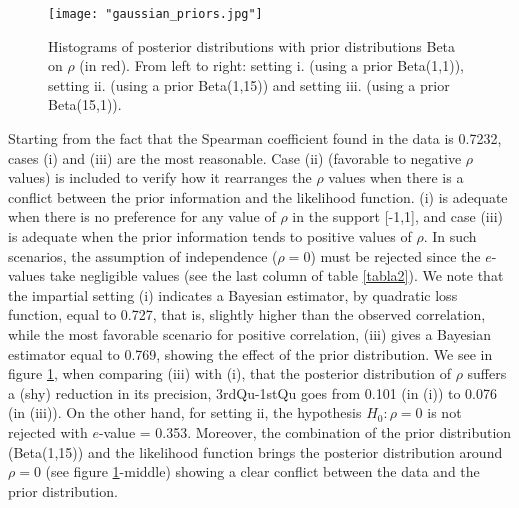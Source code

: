 \documentclass{aip-cp}
\begin{document}
\begin{figure}[h!]
\caption{Histograms of posterior distributions with prior distributions Beta on $\rho$ (in red). From left to right: setting i. (using a prior Beta(1,1)), setting ii. (using a prior Beta(1,15)) and setting iii. (using a prior Beta(15,1)). } \label{graf3}
\centering
\texttt{[image: "gaussian\_priors.jpg"]}
\end{figure}
Starting from the fact that the Spearman coefficient found in the data is 0.7232, cases (i) and (iii) are the most reasonable. Case (ii) (favorable to negative $\rho$ values) is included to verify how it rearranges the $\rho$ values when there is a conflict between the prior information and the likelihood function. (i) is adequate when there is no preference for any value of $\rho$ in the support [-1,1], and case (iii) is adequate when the prior information tends to positive values of $\rho .$ In such scenarios, the assumption of independence ($\rho=0$) must be rejected since the $e$-values take negligible values (see the last column of table \ref{tabla2}). We note that the impartial setting (i)  indicates a Bayesian estimator, by quadratic loss function, equal to 0.727, that is, slightly higher than the observed correlation, while the most favorable scenario for positive correlation, (iii) gives a Bayesian estimator equal to 0.769, showing the effect of the prior distribution. We see in figure \ref{graf3}, when comparing (iii) with (i), that the posterior distribution of $\rho$ suffers a (shy) reduction in its precision, 3rdQu-1stQu goes from 0.101 (in (i)) to  0.076 (in (iii)). On the other hand,  for setting ii, the hypothesis $H_0: \rho = 0$ is not rejected with $e$-value = 0.353. Moreover, the combination of the prior distribution (Beta(1,15)) and the likelihood function brings the posterior distribution around $\rho=0$ (see figure \ref{graf3}-middle) showing a clear conflict between the data and the prior distribution.
\end{document}
